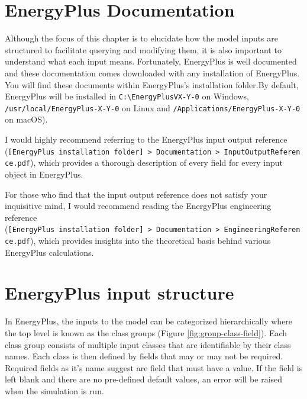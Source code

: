 \documentclass[
]{book}
\begin{document}
\hypertarget{energyplus-documentation}{%
\section{EnergyPlus Documentation}\label{energyplus-documentation}}

Although the focus of this chapter is to elucidate how the model inputs are structured to facilitate querying and modifying them, it is also important to understand what each input means. Fortunately, EnergyPlus is well documented and these documentation comes downloaded with any installation of EnergyPlus. You will find these documents within EnergyPlus's installation folder.By default, EnergyPlus will be installed in \texttt{C:\textbackslash{}EnergyPlusVX-Y-0} on Windows, \texttt{/usr/local/EnergyPlus-X-Y-0} on Linux and \texttt{/Applications/EnergyPlus-X-Y-0} on macOS).

I would highly recommend referring to the EnergyPlus input output reference (\texttt{{[}EnergyPlus\ installation\ folder{]}\ \textgreater{}\ Documentation\ \textgreater{}\ InputOutputReference.pdf}), which provides a thorough description of every field for every input object in EnergyPlus.

For those who find that the input output reference does not satisfy your inquisitive mind, I would recommend reading the EnergyPlus engineering reference (\texttt{{[}EnergyPlus\ installation\ folder{]}\ \textgreater{}\ Documentation\ \textgreater{}\ EngineeringReference.pdf}), which provides insights into the theoretical basis behind various EnergyPlus calculations.

\hypertarget{energyplus-input-structure}{%
\section{EnergyPlus input structure}\label{energyplus-input-structure}}

In EnergyPlus, the inputs to the model can be categorized hierarchically where the top level is known as the class groups (Figure \ref{fig:group-class-field}). Each class group consists of multiple input classes that are identifiable by their class names. Each class is then defined by fields that may or may not be required. Required fields as it's name suggest are field that must have a value. If the field is left blank and there are no pre-defined default values, an error will be raised when the simulation is run.
\end{document}
